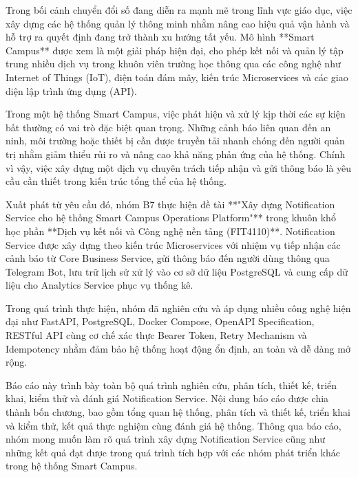 
Trong bối cảnh chuyển đổi số đang diễn ra mạnh mẽ trong lĩnh vực giáo dục, việc xây dựng các hệ thống quản lý thông minh nhằm nâng cao hiệu quả vận hành và hỗ trợ ra quyết định đang trở thành xu hướng tất yếu. Mô hình **Smart Campus** được xem là một giải pháp hiện đại, cho phép kết nối và quản lý tập trung nhiều dịch vụ trong khuôn viên trường học thông qua các công nghệ như Internet of Things (IoT), điện toán đám mây, kiến trúc Microservices và các giao diện lập trình ứng dụng (API).

Trong một hệ thống Smart Campus, việc phát hiện và xử lý kịp thời các sự kiện bất thường có vai trò đặc biệt quan trọng. Những cảnh báo liên quan đến an ninh, môi trường hoặc thiết bị cần được truyền tải nhanh chóng đến người quản trị nhằm giảm thiểu rủi ro và nâng cao khả năng phản ứng của hệ thống. Chính vì vậy, việc xây dựng một dịch vụ chuyên trách tiếp nhận và gửi thông báo là yêu cầu cần thiết trong kiến trúc tổng thể của hệ thống.

Xuất phát từ yêu cầu đó, nhóm B7 thực hiện đề tài **"Xây dựng Notification Service cho hệ thống Smart Campus Operations Platform"** trong khuôn khổ học phần **Dịch vụ kết nối và Công nghệ nền tảng (FIT4110)**. Notification Service được xây dựng theo kiến trúc Microservices với nhiệm vụ tiếp nhận các cảnh báo từ Core Business Service, gửi thông báo đến người dùng thông qua Telegram Bot, lưu trữ lịch sử xử lý vào cơ sở dữ liệu PostgreSQL và cung cấp dữ liệu cho Analytics Service phục vụ thống kê.

Trong quá trình thực hiện, nhóm đã nghiên cứu và áp dụng nhiều công nghệ hiện đại như FastAPI, PostgreSQL, Docker Compose, OpenAPI Specification, RESTful API cùng cơ chế xác thực Bearer Token, Retry Mechanism và Idempotency nhằm đảm bảo hệ thống hoạt động ổn định, an toàn và dễ dàng mở rộng.

Báo cáo này trình bày toàn bộ quá trình nghiên cứu, phân tích, thiết kế, triển khai, kiểm thử và đánh giá Notification Service. Nội dung báo cáo được chia thành bốn chương, bao gồm tổng quan hệ thống, phân tích và thiết kế, triển khai và kiểm thử, kết quả thực nghiệm cùng đánh giá hệ thống. Thông qua báo cáo, nhóm mong muốn làm rõ quá trình xây dựng Notification Service cũng như những kết quả đạt được trong quá trình tích hợp với các nhóm phát triển khác trong hệ thống Smart Campus.
